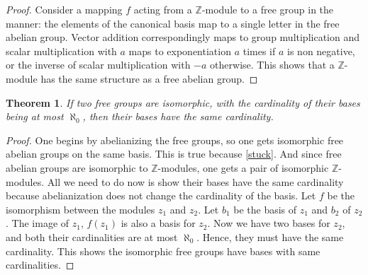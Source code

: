 \documentclass[12pt]{article}
\newtheorem{thm}{Theorem}[section]
\theoremstyle{definition}
\begin{document}
\begin{proof}
Consider a mapping $f$ acting from a $\mathbb{Z}$-module to a free group in the manner: the elements of the canonical basis map to a single letter in the free abelian group. Vector addition correspondingly maps to group multiplication and scalar multiplication with $a$ maps to exponentiation $a$ times if $a$ is non negative, or the inverse of scalar multiplication with $-a$ otherwise. This shows that a $\mathbb{Z}$-module has the same structure as a free abelian group.
\end{proof}

\begin{thm}\label{conv}
If two free groups are isomorphic, with the cardinality of their bases being at most $\aleph_0$, then their bases have the same cardinality.
\end{thm}

\begin{proof}
One begins by abelianizing the free groups, so one gets isomorphic free abelian groups on the same basis. This is true because \autoref{stuck}. And since free abelian groups are isomorphic to $\mathbb{Z}$-modules, one gets a pair of isomorphic $\mathbb{Z}$-modules. All we need to do now is show their bases have the same cardinality because abelianization does not change the cardinality of the basis. Let $f$ be the isomorphism between the modules $z_1$ and $z_2$. Let $b_1$ be the basis of $z_1$ and $b_2$ of $z_2$. The image of $z_1$, $f(z_1)$ is also a basis for $z_2$. Now we have two bases for $z_2$, and both their cardinalities are at most $\aleph_0$. Hence, they must have the same cardinality. This shows the isomorphic free groups have bases with same cardinalities.
\end{proof}
\end{document}
